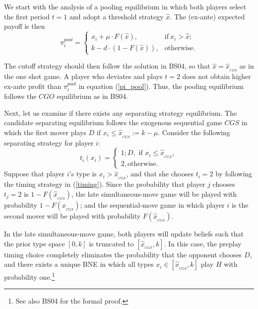 \documentclass[11pt,english]{article}
\begin{document}
We start with the analysis of a pooling equilibrium in which both players select the first period $t=1$ and adopt a threshold strategy $\hat{x}$. The (ex-ante) expected payoff is then
\begin{equation}
   \pi^{pool}_{i} = 
   \begin{cases}
    x_i + \mu \cdot F(\hat{x}), &  \text{if} \  x_{i}> \hat{x};\\
    k - d \cdot (1-F(\hat{x})), & \text{otherwise}. 
   \end{cases}
   \label{pi_pool}
\end{equation}

The cutoff strategy should then follow the solution in BS04, so that $\hat{x}=\hat{x}_{_{CG0}}$ as in the one shot game. A player who deviates and plays $t=2$ does not obtain higher ex-ante profit than $\pi^{pool}_{i}$  in equation (\ref{pi_pool}). Thus, the pooling equilibrium follows the $CGO$ equilibrium as in BS04. 

Next, let us examine if there exists any separating strategy equilibrium. The candidate separating equilibrium follows the exogenous sequential game $CGS$ in which the first mover plays $D$ if $x_i\leq \hat{x}_{_{CGS}}:= k-\mu$. Consider the following separating strategy for player $i $:
\begin{equation}
 t_i(x_i)=
 \begin{cases} 1; D, \mbox{ if } x_i  \leq \hat{x}_{_{CGS}}, \\
 2,  \text{otherwise}.
 \end{cases}
 \label{timing}
\end{equation}
Suppose that player $i$'s type is $x_i >\hat{x}_{_{CGS}}$, and that she chooses $t_i=2$ by following the timing strategy  in (\ref{timing}).  Since the probability that player $j$ chooses $t_j=2$ is $1-F(\hat{x}_{_{CGS}})$, the late simultaneous-move game will be played with probability $1-F(\hat{x}_{_{CGS}})$; and the sequential-move game in which player $i$ is the second mover will be played with probability $F(\hat{x}_{_{CGS}})$.

In the late simultaneous-move game, both players will update beliefs such that the prior type space $[0, k]$ is truncated to $[\hat{x}_{_{CGS}},k]$. In this case, the preplay timing choice completely eliminates the probability that the opponent chooses $D$, and there exists a unique BNE in which all types $x_i \in [\hat{x}_{_{CGS}},k]$ play $H$ with probability one.\footnote{See also BS04 for the formal proof.} 
 
\end{document}
